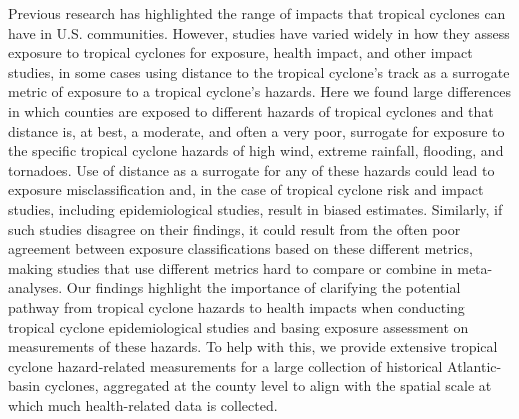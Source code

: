Previous research has highlighted the range of impacts that tropical cyclones
can have in U.S. communities. However, studies have varied widely in how they assess
exposure to tropical cyclones for exposure, health impact, and other impact
studies, in some cases using distance to the tropical cyclone's track as a
surrogate metric of exposure to a tropical cyclone's hazards. Here we found
large differences in which counties are exposed to different hazards of
tropical cyclones and that distance is, at best, a moderate, and often a very
poor, surrogate for exposure to the specific tropical cyclone hazards of high
wind, extreme rainfall, flooding, and tornadoes. Use of distance as a surrogate
for any of these hazards could lead to exposure misclassification and, in the
case of tropical cyclone risk and impact studies, including epidemiological
studies, result in biased estimates.  Similarly, if such studies disagree on
their findings, it could result from the often poor agreement between exposure
classifications based on these different metrics, making studies that use
different metrics hard to compare or combine in meta-analyses. Our findings
highlight the importance of clarifying the potential pathway from tropical
cyclone hazards to health impacts when conducting tropical cyclone
epidemiological studies and basing exposure assessment on measurements of these
hazards. To help with this, we provide extensive tropical cyclone
hazard-related measurements for a large collection of historical Atlantic-basin
cyclones, aggregated at the county level to align with the spatial scale at
which much health-related data is collected.
